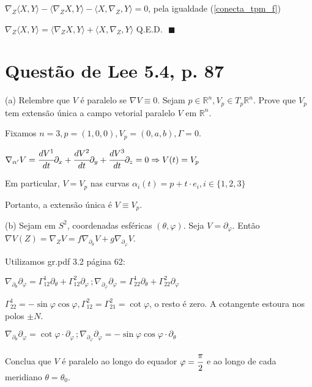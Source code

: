 \documentclass[12pt]{article}
\begin{document}
		$\nabla_Z \langle X, Y\rangle - \langle \nabla_Z X, Y \rangle - \langle X, \nabla_Z, Y \rangle = 0$, pela igualdade (\ref{conecta_tpm_f})

		$\nabla_Z \langle X, Y\rangle = \langle \nabla_Z X, Y \rangle + \langle X, \nabla_Z, Y \rangle$ Q.E.D. $\,\,\blacksquare$

	\section{Quest\~ao de Lee 5.4, p. 87}
		\begin{flushright}
		\end{flushright}

		(a) Relembre que $V$ \'e paralelo se $\nabla V \equiv 0$. Sejam $p \in \mathbb{R}^n, V_p \in T_p \mathbb{R}^n$. Prove que $V_p$ tem extens\~ao \'unica a campo vetorial paralelo $V$ em $\mathbb{R}^n$.

		Fixamos $n = 3, p = (1,0,0), V_p = (0, a, b), \Gamma = 0$.

		$\nabla_{\alpha'} V = \cfrac{dV^1}{dt} \partial_x + \cfrac{dV^2}{dt} \partial_y + \cfrac{dV^3}{dt} \partial_z = 0 \Rightarrow V(t) = V_p$

		Em particular, $V = V_p$ nas curvas $\alpha_i(t) = p + t \cdot e_i, i \in \{ 1,2,3 \}$

		Portanto, a extens\~ao \'unica \'e $V \equiv V_p$.

		\vspace{3mm}

		(b) Sejam em $S^2$, coordenadas esf\'ericas $(\theta, \varphi)$. Seja $V = \partial_\varphi$. Ent\~ao $\nabla V(Z) = \nabla_Z V = f \nabla_{\partial_\theta}V + g\nabla_{\partial_\varphi}V$.

		Utilizamos gr.pdf 3.2 p\'agina 62:

		$\nabla_{\partial_\theta} \partial_\varphi = \Gamma_{12}^1 \partial_\theta + \Gamma_{12}^2 \partial_\varphi\,;\nabla_{\partial_\varphi} \partial_\varphi = \Gamma_{22}^1 \partial_\theta + \Gamma_{22}^2 \partial_\varphi$

		$\Gamma_{22}^1 = - \sin \varphi \cos \varphi, \Gamma_{12}^2 = \Gamma_{21}^2 = \cot \varphi$, o resto \'e zero. A cotangente estoura nos polos $\pm N$.

		$\nabla_{\partial_\theta} \partial_\varphi = \cot \varphi \cdot \partial_\varphi\,;\nabla_{\partial_\varphi} \partial_\varphi = - \sin \varphi \cos \varphi \cdot \partial_\theta$

		Conclua que $V$ \'e paralelo ao longo do equador $\varphi = \cfrac{\pi}{2}$ e ao longo de cada meridiano $\theta = \theta_0$.
\end{document}
